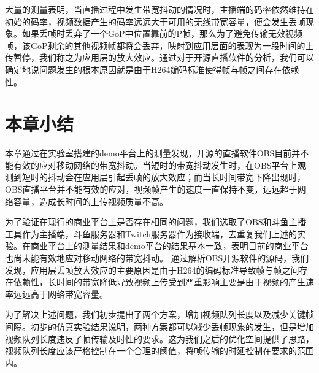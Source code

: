 大量的测量表明，当直播过程中发生带宽抖动的情况时，主播端的码率依然维持在初始的码率，视频数据产生的码率远远大于可用的无线带宽容量，便会发生丢帧现象。如果丢帧时丢弃了一个GoP中位置靠前的P帧，那么为了避免传输无效视频帧，该GoP剩余的其他视频帧都将会丢弃，映射到应用层面的表现为一段时间的上传暂停，我们称之为应用层的放大效应。通过对于开源直播软件的分析，我们可以确定地说问题发生的根本原因就是由于H264编码标准使得帧与帧之间存在依赖性。

\section{本章小结}
本章通过在实验室搭建的demo平台上的测量发现，开源的直播软件OBS目前并不能有效的应对移动网络的带宽抖动。当短时的带宽抖动发生时，在OBS平台上观测到短时的抖动会在应用层引起丢帧的放大效应；而当长时间带宽下降出现时，OBS直播平台并不能有效的应对，视频帧产生的速度一直保持不变，远远超于网络容量，造成长时间的上传视频质量不高。

为了验证在现行的商业平台上是否存在相同的问题，我们选取了OBS和斗鱼主播工具作为主播端，斗鱼服务器和Twitch服务器作为接收端，去重复我们上述的实验。在商业平台上的测量结果和demo平台的结果基本一致，表明目前的商业平台也尚未能有效地应对移动网络的带宽抖动。 通过解析OBS开源软件的源码，我们发现，应用层丢帧放大效应的主要原因是由于H264的编码标准导致帧与帧之间存在依赖性，长时间的带宽降低导致视频上传受到严重影响主要是由于视频的产生速率远远高于网络带宽容量。

为了解决上述问题，我们初步提出了两个方案，增加视频队列长度以及减少关键帧间隔。初步的仿真实验结果说明，两种方案都可以减少丢帧现象的发生，但是增加视频队列长度违反了帧传输及时性的要求。这为我们之后的优化空间提供了思路，视频队列长度应该严格控制在一个合理的阈值，将帧传输的时延控制在要求的范围内。